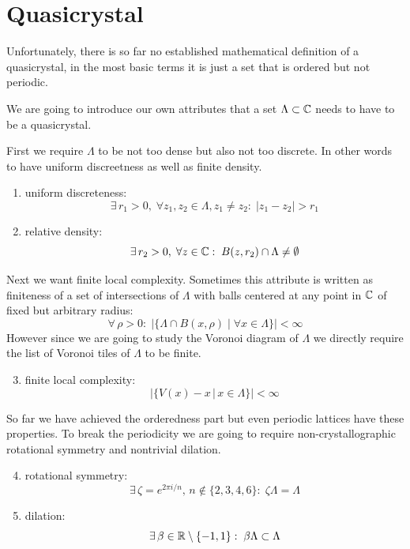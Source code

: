 \documentclass[text.tex]{subfiles}
\begin{document}
\section{Quasicrystal}\label{sec_quasicrystalEaseIn}%
Unfortunately, there is so far no established mathematical definition of a quasicrystal, in the most basic terms it is just a set that is ordered but not periodic. 

We are going to introduce our own attributes that a set $\Lambda\subset\mathbb{C}$ needs to have to be a quasicrystal. 

First we require $\Lambda$ to be not too dense but also not too discrete. In other words to have uniform discreetness as well as finite density. 

\begin{enumerate}
\item uniform discreteness: $$\exists\,r_1>0,\; \forall z_1,z_2\in\Lambda, z_1\neq z_2:\; |z_1-z_2|>r_1$$
\item relative density: $$\exists\,r_2>0,\; \forall z\in\mathbb{C}:\; B(z,r_2)\cap\Lambda \neq \emptyset$$
\end{enumerate}

Next we want finite local complexity. Sometimes this attribute is written as finiteness of a set of intersections of $\Lambda$ with balls centered at any point in $\mathbb{C}$ of fixed but arbitrary radius:
$$\forall\,\rho>0:\;\big|\{\Lambda\cap B(x,\rho)\;|\;\forall x\in\Lambda\}\big| < \infty$$
However since we are going to study the Voronoi diagram of $\Lambda$ we directly require the list of Voronoi tiles of $\Lambda$ to be finite. 

\begin{enumerate}
\setcounter{enumi}{2}
\item finite local complexity: $$\big|\{V(x)-x\,|\, x\in \Lambda\}\big|<\infty$$
\end{enumerate}

So far we have achieved the orderedness part but even periodic lattices have these properties. To break the periodicity we are going to require non-crystallographic rotational symmetry and nontrivial dilation.  

\begin{enumerate}
\setcounter{enumi}{3}
\item rotational symmetry: $$\exists\,\zeta = e^{2\pi i/n},\,n\not\in\{2,3,4,6\}:\; \zeta\Lambda = \Lambda$$
\item dilation: $$\exists\,\beta\in\mathbb{R}\setminus\{-1,1\}:\; \beta\Lambda\subset \Lambda$$
\end{enumerate}
\end{document}

